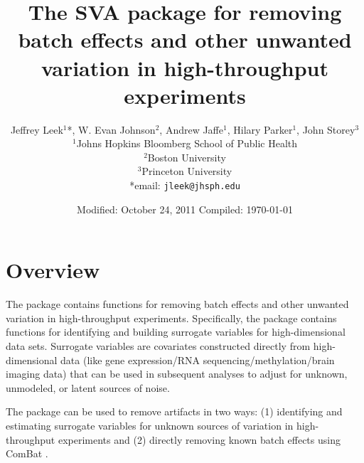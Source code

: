\documentclass[12pt]{article}
\begin{document}
 

\title{The SVA package for removing batch effects and other unwanted variation in high-throughput experiments}
\author{Jeffrey Leek$^1$*, W. Evan Johnson$^2$, Andrew Jaffe$^1$, Hilary Parker$^1$, John Storey$^3$ \\
$^1$Johns Hopkins Bloomberg School of Public Health \\
$^2$Boston University\\
$^3$Princeton University\\
*email: \texttt{jleek@jhsph.edu}}
\date{Modified: October 24, 2011  Compiled: \today}
\maketitle

\tableofcontents

\section{Overview}

The  package contains functions for removing batch effects and other unwanted variation in high-throughput experiments. Specifically, the  package contains functions for identifying and building surrogate variables for high-dimensional data sets. Surrogate variables are covariates constructed directly from high-dimensional data (like gene expression/RNA sequencing/methylation/brain imaging data) that can be used in subsequent analyses to adjust for unknown, unmodeled, or latent sources of noise. 

The  package can be used to remove artifacts in two ways: (1) identifying and estimating surrogate variables for unknown sources of variation in high-throughput experiments and (2) directly removing known batch effects using ComBat \cite{johnson:2007aa}. 
\end{document}
